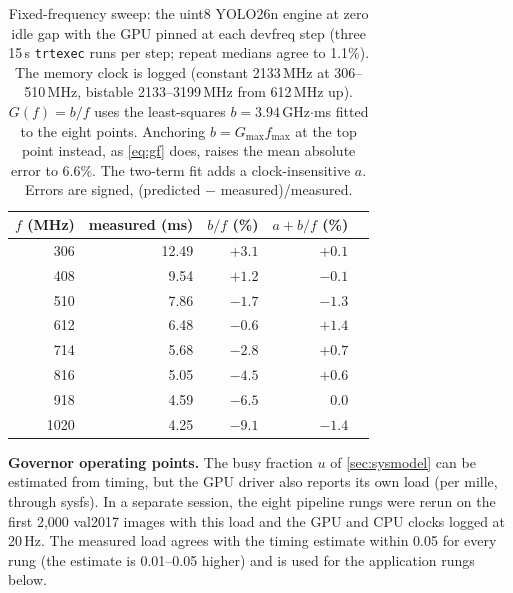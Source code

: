 \begin{table}[t]
\centering
\caption{Fixed-frequency sweep: the uint8 YOLO26n engine at zero idle
gap with the GPU pinned at each devfreq step (three 15\,s
\texttt{trtexec} runs per step; repeat medians agree to 1.1\%). The
memory clock is logged (constant 2133\,MHz at 306--510\,MHz,
bistable 2133--3199\,MHz from 612\,MHz up).
$G(f)=b/f$ uses the least-squares $b=3.94$\,GHz$\cdot$ms fitted to the
eight points. Anchoring $b=G_{\max}f_{\max}$ at the top point instead,
as \cref{eq:gf} does, raises the mean absolute error to 6.6\%.
The two-term fit adds
a clock-insensitive $a$. Errors are signed, (predicted $-$
measured)/measured.}
\label{tab:fixedfreq}
\small
\begin{tabular}{r rr rr}
\toprule
$f$ (MHz) & measured (ms) & $b/f$ (\%) & $a{+}b/f$ (\%) \\
\midrule
306  & 12.49 & $+3.1$ & $+0.1$ \\
408  &  9.54 & $+1.2$ & $-0.1$ \\
510  &  7.86 & $-1.7$ & $-1.3$ \\
612  &  6.48 & $-0.6$ & $+1.4$ \\
714  &  5.68 & $-2.8$ & $+0.7$ \\
816  &  5.05 & $-4.5$ & $+0.6$ \\
918  &  4.59 & $-6.5$ & $ 0.0$ \\
1020 &  4.25 & $-9.1$ & $-1.4$ \\
\bottomrule
\end{tabular}
\end{table}

\textbf{Governor operating points.}
The busy fraction $u$ of \cref{sec:sysmodel} can be estimated from
timing, but the GPU driver also reports its own load (per mille,
through sysfs). In a separate session, the eight pipeline rungs were
rerun on the first 2,000 val2017 images with this load and the GPU and
CPU clocks logged at 20\,Hz. The measured load agrees with the timing
estimate within 0.05 for every rung (the estimate is 0.01--0.05
higher) and is used for the application rungs below.

